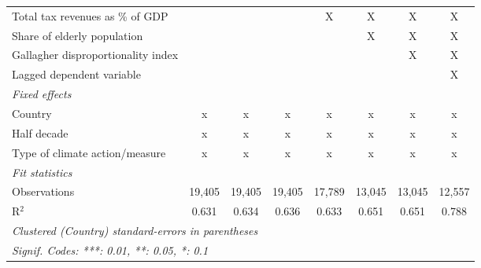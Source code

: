 \begin{tabular}{lccccccc}
   Total tax revenues as \% of GDP                                                           &                &                &                & X             & X       & X       & X\\  
   Share of elderly population                                                               &                &                &                &               & X       & X       & X\\  
   Gallagher disproportionality index                                                        &                &                &                &               &         & X       & X\\  
   Lagged dependent variable                                                                 &                &                &                &               &         &         & X\\  
   \emph{Fixed effects}\\
   Country                                                                                   & x              & x              & x              & x             & x       & x       & x\\  
   Half decade                                                                               & x              & x              & x              & x             & x       & x       & x\\  
   Type of climate action/measure                                                            & x              & x              & x              & x             & x       & x       & x\\  
   \midrule \emph{Fit statistics}\\
   Observations                                                                              & 19,405         & 19,405         & 19,405         & 17,789        & 13,045  & 13,045  & 12,557\\  
   R$^2$                                                                                     & 0.631          & 0.634          & 0.636          & 0.633         & 0.651   & 0.651   & 0.788\\  
   \midrule
   \multicolumn{8}{l}{\emph{Clustered (Country) standard-errors in parentheses}}\\
   \multicolumn{8}{l}{\emph{Signif. Codes: ***: 0.01, **: 0.05, *: 0.1}}\\
\end{tabular}
\par\endgroup


